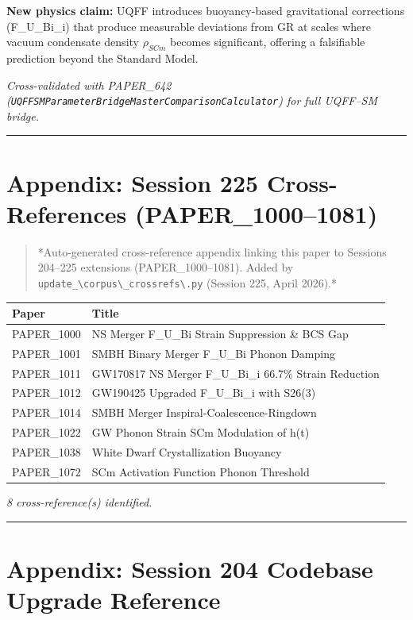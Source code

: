 \documentclass[12pt,a4paper]{article}
\begin{document}
\textbf{New physics claim:} UQFF introduces buoyancy-based gravitational corrections (F\_{U\_Bi\_i}) that produce measurable deviations from GR at scales where vacuum condensate density $\rho_{SCm}$ becomes significant, offering a falsifiable prediction beyond the Standard Model.

\emph{Cross-validated with PAPER\_642 (\texttt{UQFFSMParameterBridgeMasterComparisonCalculator}) for full UQFF--SM bridge.}

\medskip\hrule\medskip

\section{Appendix: Session 225 Cross-References (PAPER\_1000--1081)}

\begin{quote}
*Auto-generated cross-reference appendix linking this paper to
Sessions 204--225 extensions (PAPER\_1000--1081). Added by
\texttt{update\_\textbackslash {corpus\textbackslash \_crossrefs\textbackslash }.py} (Session 225, April 2026).*
\end{quote}

\begin{table}[H]
\centering
\small
\begin{tabularx}{\linewidth}{@{}>{\raggedright\arraybackslash}X>{\raggedright\arraybackslash}X@{}}
\toprule
Paper & Title \tabularnewline
\midrule
PAPER\_1000 & NS Merger F\_{U\_Bi} Strain Suppression \& BCS Gap \tabularnewline
PAPER\_1001 & SMBH Binary Merger F\_{U\_Bi} Phonon Damping \tabularnewline
PAPER\_1011 & GW170817 NS Merger F\_{U\_Bi\_i} 66.7\% Strain Reduction \tabularnewline
PAPER\_1012 & GW190425 Upgraded F\_{U\_Bi\_i} with S26(3) \tabularnewline
PAPER\_1014 & SMBH Merger Inspiral-Coalescence-Ringdown \tabularnewline
PAPER\_1022 & GW Phonon Strain SCm Modulation of h(t) \tabularnewline
PAPER\_1038 & White Dwarf Crystallization Buoyancy \tabularnewline
PAPER\_1072 & SCm Activation Function Phonon Threshold \tabularnewline
\bottomrule
\end{tabularx}
\end{table}

\emph{8 cross-reference(s) identified.}

\medskip\hrule\medskip

\section{Appendix: Session 204 Codebase Upgrade Reference}
\end{document}
